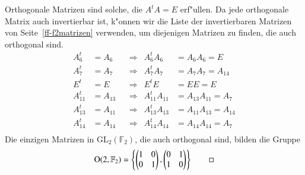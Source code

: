 \begin{beispiel}
Orthogonale Matrizen sind solche, die $A^tA=E$ erf"ullen.
Da jede orthogonale Matrix auch invertierbar ist, k"onnen
wir die Liste der invertierbaren Matrizen von
Seite~\eqref{ff-f2matrizen} verwenden, um diejenigen Matrizen zu finden,
die auch orthogonal sind.
\[
\begin{aligned}
 A_6^t   &=A_6   &&\Rightarrow&A_6^t   A_6   &=A_6   A_6   =E     \\
 A_7^t   &=A_7   &&\Rightarrow&A_7^t   A_7   &=A_7   A_7   =A_{14}\\
   E^t   &=E     &&\Rightarrow&  E^t   E     &=E     E     =E     \\
 A_{11}^t&=A_{13}&&\Rightarrow&A_{11}^tA_{11}&=A_{13}A_{11}=A_7   \\
 A_{13}^t&=A_{11}&&\Rightarrow&A_{13}^tA_{13}&=A_{11}A_{13}=A_{14}\\
 A_{14}^t&=A_{14}&&\Rightarrow&A_{14}^tA_{14}&=A_{14}A_{14}=A_7   \\
\end{aligned}
\]
Die einzigen Matrizen in $\textrm{GL}_2(\mathbb F_2)$, die auch orthogonal
sind, bilden die Gruppe
\[
\textrm{O}(2,\mathbb F_2)
=
\left\{
\begin{pmatrix}1&0\\0&1\end{pmatrix},
\begin{pmatrix}0&1\\1&0\end{pmatrix}
\right\}
\qedhere
\]
\end{beispiel}




